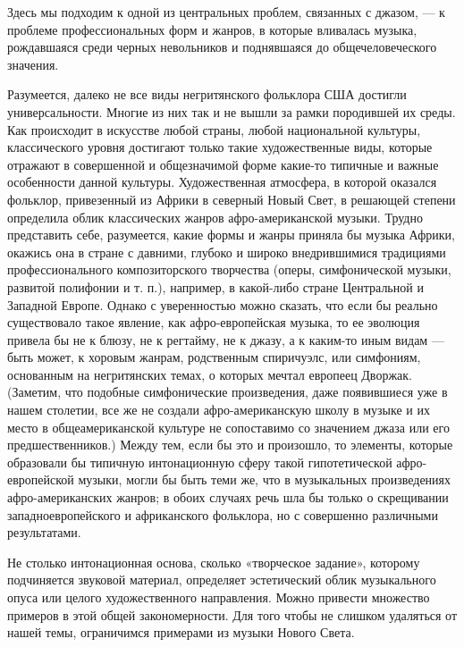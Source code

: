 Здесь  мы  подходим  к  одной  из  центральных  проблем,  связанных  с
джазом,  —  к  проблеме  профессиональных форм  и  жанров,  в  которые
вливалась музыка,  рождавшаяся среди черных невольников  и поднявшаяся
до общечеловеческого значения.

Разумеется, далеко  не все  виды негритянского фольклора  США достигли
универсальности. Многие из  них так и не вышли за  рамки породившей их
среды.  Как происходит  в искусстве  любой страны,  любой национальной
культуры, классического  уровня достигают только  такие художественные
виды,  которые отражают  в совершенной  и общезначимой  форме какие-то
типичные   и  важные   особенности  данной   культуры.  Художественная
атмосфера,  в  которой  оказался  фольклор, привезенный  из  Африки  в
северный Новый Свет, в  решающей степени определила облик классических
жанров афро-американской музыки.  Трудно представить себе, разумеется,
какие формы и  жанры приняла бы музыка Африки, окажись  она в стране с
давними, глубоко  и широко внедрившимися  традициями профессионального
композиторского  творчества  (оперы,  симфонической  музыки,  развитой
полифонии  и  т. п.),  например,  в  какой-либо стране  Центральной  и
Западной  Европе. Однако  с уверенностью  можно сказать,  что если  бы
реально существовало такое явление, как афро-европейская музыка, то ее
эволюция  привела бы  не к  блюзу,  не к  регтайму,  не к  джазу, а  к
каким-то  иным  видам —  быть  может,  к хоровым  жанрам,  родственным
спиричуэлс,  или  симфониям,  основанным   на  негритянских  темах,  о
которых мечтал европеец Дворжак.  (Заметим, что подобные симфонические
произведения, даже появившиеся уже в нашем столетии, все же не создали
афро-американскую  школу  в  музыке  и  их  место  в  общеамериканской
культуре не сопоставимо со  значением джаза или его предшественников.)
Между тем, если бы это и произошло, то элементы, которые образовали бы
типичную  интонационную  сферу такой  гипотетической  афро-европейской
музыки,  могли  бы  быть  теми же,  что  в  музыкальных  произведениях
афро-американских  жанров;  в  обоих  случаях речь  шла  бы  только  о
скрещивании  западноевропейского   и  африканского  фольклора,   но  с
совершенно различными результатами.

Не  столько   интонационная  основа,  сколько   «творческое  задание»,
которому подчиняется звуковой  материал, определяет эстетический облик
музыкального  опуса  или  целого  художественного  направления.  Можно
привести  множество примеров  в  этой общей  закономерности. Для  того
чтобы не  слишком удаляться  от нашей  темы, ограничимся  примерами из
музыки Нового Света.

